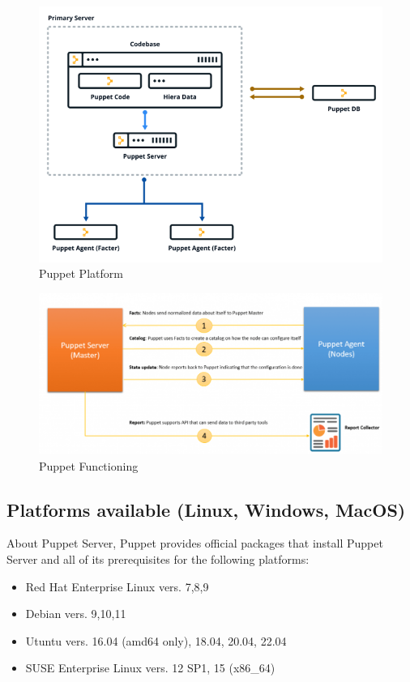 \documentclass[12pt,a4paper,openright,twoside]{book}
\begin{document}
\begin{figure}[H]
    \centering
    \includegraphics[width=.8\linewidth]{figures/puppetplatformjpeg.png}
    \caption{Puppet Platform}
    \label{fig:puppet-platform-image}
\end{figure}\cite{puppetDocPlatform}

\begin{figure}[H]
    \centering
    \includegraphics[width=.8\linewidth]{figures/puppetfunctioning.png}
    \caption{Puppet Functioning}
    \label{fig:puppet-functioning-image}
\end{figure}\cite{puppetImgFunctioning}

\subsection{Platforms available (Linux, Windows, MacOS)}

About Puppet Server, Puppet provides official packages that install Puppet Server and all of its prerequisites for the following platforms:

\begin{itemize}
    \item Red Hat Enterprise Linux vers. 7,8,9
    \item Debian vers. 9,10,11
    \item Utuntu vers. 16.04 (amd64 only), 18.04, 20.04, 22.04
    \item SUSE Enterprise Linux vers. 12 SP1, 15 (x86\_64)
\end{itemize}
\end{document}
